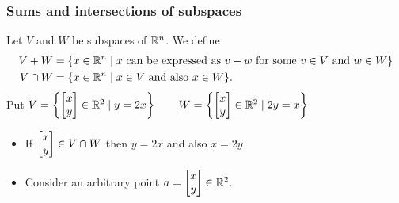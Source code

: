 \documentclass[9pt]{beamer}
\begin{document}
\begin{frame}[t]
 \frametitle{Sums and intersections of subspaces}
 
 {\large{}}
  Let $V$ and $W$ be subspaces of ${\mathbb{R}}^n$.  We define
  \begin{align*}
   V+W &= \{x\in{\mathbb{R}}^n\;|\; x \text{ can be expressed as } v+w
             \text{ for some } v\in V \text{ and } w\in W\} \\
   V\cap W &= \{x\in{\mathbb{R}}^n\;|\; x\in V \text{ and also } x\in W\}.
  \end{align*}
  \vspace{-1ex}
 {\large{}}
  Put
  $ V = \left\{\left[\begin{matrix} x\\ y\end{matrix}\right]\in{\mathbb{R}}^2\;|\; y=2x\right\} \qquad
    W = \left\{\left[\begin{matrix} x\\ y\end{matrix}\right]\in{\mathbb{R}}^2\;|\; 2y=x\right\}
  $

  \begin{itemize}
   \item<2-> If $\left[\begin{matrix} x\\ y\end{matrix}\right]\in V\cap W$ then $y=2x$ and also
    $x=2y$
   \item<6-> Consider an arbitrary point $a=\left[\begin{matrix} x\\y \end{matrix}\right]\in{\mathbb{R}}^2$.
  \end{itemize}
\end{frame}
\end{document}
